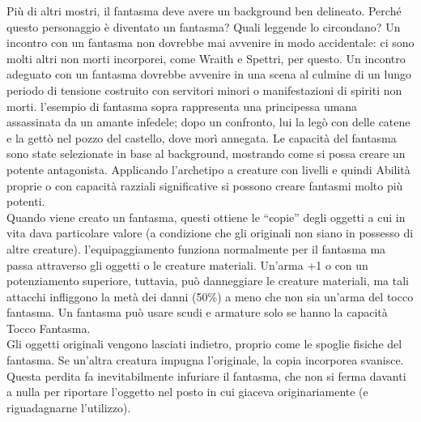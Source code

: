 \begin{multicols}{2}
Più di altri mostri, il fantasma deve avere un background ben delineato. Perché questo personaggio è diventato un fantasma? Quali leggende lo circondano? Un incontro con un fantasma non dovrebbe mai avvenire in modo accidentale: ci sono molti altri non morti incorporei, come Wraith e Spettri, per questo. Un incontro adeguato con un fantasma dovrebbe avvenire in una scena al culmine di un lungo periodo di tensione costruito con servitori minori o manifestazioni di spiriti non morti. l'esempio di fantasma sopra rappresenta una principessa umana assassinata da un amante infedele; dopo un confronto, lui la legò con delle catene e la gettò nel pozzo del castello, dove morì annegata. Le capacità del fantasma sono state selezionate in base al background, mostrando come si possa creare un potente antagonista. Applicando l'archetipo a creature con livelli e quindi Abilità proprie o con capacità razziali significative si possono creare fantasmi molto più potenti.\\

Quando viene creato un fantasma, questi ottiene le “copie” degli oggetti a cui in vita dava particolare valore (a condizione che gli originali non siano in possesso di altre creature). l'equipaggiamento funziona normalmente per il fantasma ma passa attraverso gli oggetti o le creature materiali. Un’arma +1 o con un potenziamento superiore, tuttavia, può danneggiare le creature materiali, ma tali attacchi infliggono la metà dei danni (50\%) a meno che non sia un’arma del tocco fantasma. Un fantasma può usare scudi e armature solo se hanno la capacità Tocco Fantasma.\\

Gli oggetti originali vengono lasciati indietro, proprio come le spoglie fisiche del fantasma. Se un’altra creatura impugna l'originale, la copia incorporea svanisce. Questa perdita fa inevitabilmente infuriare il fantasma, che non si ferma davanti a nulla per riportare l'oggetto nel posto in cui giaceva originariamente (e riguadagnarne l'utilizzo).\\


\end{multicols}

